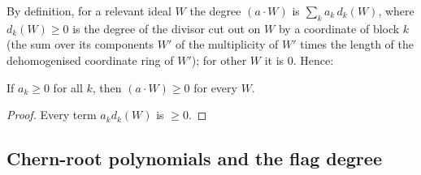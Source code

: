 By definition, for a relevant ideal $W$ the degree $(a\cdot W)$ is $\sum_ka_k\,d_k(W)$, where $d_k(W)\ge0$ is the
degree of the divisor cut out on $W$ by a coordinate of block $k$ (the sum over its components $W'$ of the
multiplicity of $W'$ times the length of the dehomogenised coordinate ring of $W'$); for other $W$ it is $0$. Hence:

\begin{lemma}\label{pf:volthm:lem:curvedeg}
If $a_k\ge0$ for all $k$, then $(a\cdot W)\ge0$ for every $W$.
\end{lemma}

\begin{proof}
Every term $a_kd_k(W)$ is $\ge0$.
\end{proof}

\subsection{Chern-root polynomials and the flag degree}\label{pf:volthm:sec:poly}

